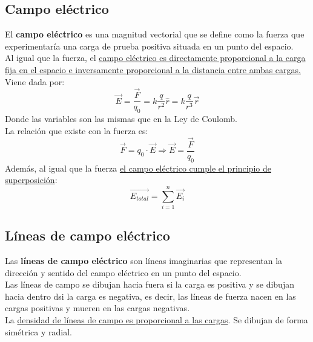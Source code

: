 \subsection{Campo eléctrico}
El \textbf{campo eléctrico} es una magnitud vectorial que se define como la fuerza que experimentaría una carga de prueba positiva situada en un punto del espacio.\\
Al igual que la fuerza, el \uline{campo eléctrico es directamente proporcional a la carga fija en el espacio e inversamente proporcional a la distancia entre ambas cargas.} 
Viene dada por: 
\begin{equation}
    \vec{E} = \frac{\vec{F}}{q_0} = k \frac{q}{r^2} \hat{r} = k \frac{q}{r^3} \vec{r}
\end{equation}
Donde las variables son las mismas que en la Ley de Coulomb.\\
La relación que existe con la fuerza es: 
\begin{equation}
    \vec{F} = q_0 \cdot \vec{E} \Rightarrow \vec{E} = \frac{\vec{F}}{q_0}
\end{equation}
Además, al igual que la fuerza \uline{el campo eléctrico cumple el principio de superposición}: $$\vec{E_{total}} = \sum_{i=1}^{n} \vec{E_i}$$

\subsection{Líneas de campo eléctrico}
Las \textbf{líneas de campo eléctrico} son líneas imaginarias que representan la dirección y sentido del campo eléctrico en un punto del espacio.\\
Las líneas de campo se dibujan hacia fuera si la carga es positiva y se dibujan hacia dentro dsi la carga es negativa, es decir, las líneas de fuerza nacen en las cargas positivas y mueren en las cargas negativas. \\
La \uline{densidad de líneas de campo es proporcional a las cargas}. Se dibujan de forma simétrica y radial. \\


